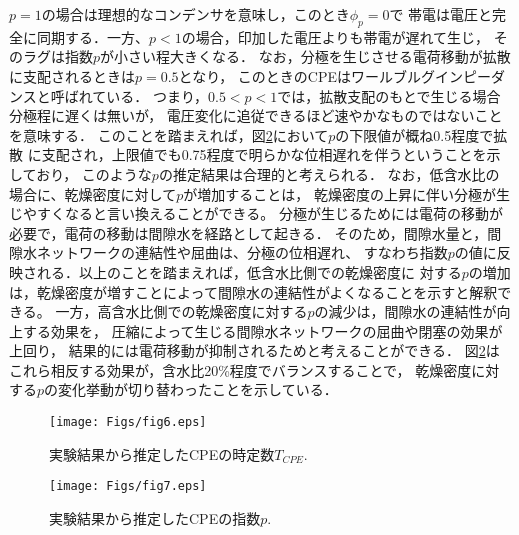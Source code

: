 \documentclass{jsce}
\begin{document}
$p=1$の場合は理想的なコンデンサを意味し，このとき$\phi_p=0$で
帯電は電圧と完全に同期する．一方、$p<1$の場合，印加した電圧よりも帯電が遅れて生じ，
そのラグは指数$p$が小さい程大きくなる．
なお，分極を生じさせる電荷移動が拡散に支配されるときは$p=0.5$となり，
このときのCPEはワールブルグインピーダンスと呼ばれている．
つまり，$0.5<p<1$では，拡散支配のもとで生じる場合分極程に遅くは無いが，
電圧変化に追従できるほど速やかなものではないことを意味する．
このことを踏まえれば，図\ref{fig:fig7}において$p$の下限値が概ね0.5程度で拡散
に支配され，上限値でも0.75程度で明らかな位相遅れを伴うということを示しており，
このような$p$の推定結果は合理的と考えられる．
なお，低含水比の場合に、乾燥密度に対して$p$が増加することは，
乾燥密度の上昇に伴い分極が生じやすくなると言い換えることができる。
分極が生じるためには電荷の移動が必要で，電荷の移動は間隙水を経路として起きる．
そのため，間隙水量と，間隙水ネットワークの連結性や屈曲は、分極の位相遅れ、
すなわち指数$p$の値に反映される．以上のことを踏まえれば，低含水比側での乾燥密度に
対する$p$の増加は，乾燥密度が増すことによって間隙水の連結性がよくなることを示すと解釈できる。
一方，高含水比側での乾燥密度に対する$p$の減少は，間隙水の連結性が向上する効果を，
圧縮によって生じる間隙水ネットワークの屈曲や閉塞の効果が上回り，
結果的には電荷移動が抑制されるためと考えることができる．
図\ref{fig:fig7}はこれら相反する効果が，含水比20\%程度でバランスすることで，
乾燥密度に対する$p$の変化挙動が切り替わったことを示している．
\begin{figure}[h]
	\begin{center}
	\texttt{[image: Figs/fig6.eps]} 
	\end{center}
\vspace{-3mm}
	 \caption{
		実験結果から推定したCPEの時定数$T_{CPE}$.
	} 
	\label{fig:fig6}
\end{figure}
\begin{figure}[h]
	\begin{center}
	\texttt{[image: Figs/fig7.eps]} 
	\end{center}
\vspace{-3mm}
	\caption{
		実験結果から推定したCPEの指数$p$.
	} 
	\label{fig:fig7}
\end{figure}
\vspace{-4mm}
\end{document}
